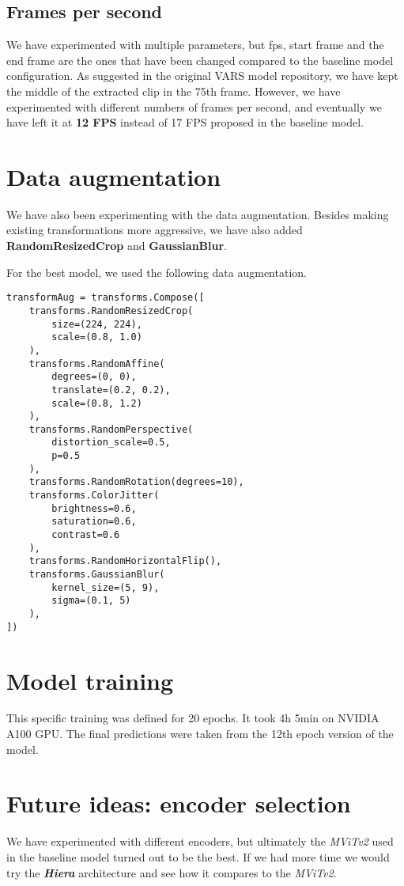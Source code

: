 \documentclass[conference]{IEEEtran}
\begin{document}
\subsection{Frames per second}
We have experimented with multiple parameters, but fps, start frame and the end frame are the ones that have been changed compared to the baseline model configuration. As suggested in the original VARS model repository, we have kept the middle of the extracted clip in the 75th frame. However, we have experimented with different numbers of frames per second, and eventually we have left it at \textbf{12 FPS} instead of 17 FPS proposed in the baseline model.

\section{Data augmentation}
We have also been experimenting with the data augmentation. Besides making existing transformations more aggressive, we have also added \textbf{RandomResizedCrop} and \textbf{GaussianBlur}.

For the best model, we used the following data augmentation.

\begin{verbatim}
transformAug = transforms.Compose([
    transforms.RandomResizedCrop(
        size=(224, 224),
        scale=(0.8, 1.0)
    ),
    transforms.RandomAffine(
        degrees=(0, 0),
        translate=(0.2, 0.2),
        scale=(0.8, 1.2)
    ),
    transforms.RandomPerspective(
        distortion_scale=0.5,
        p=0.5
    ),
    transforms.RandomRotation(degrees=10),
    transforms.ColorJitter(
        brightness=0.6,
        saturation=0.6,
        contrast=0.6
    ),
    transforms.RandomHorizontalFlip(),
    transforms.GaussianBlur(
        kernel_size=(5, 9),
        sigma=(0.1, 5)
    ),
])
\end{verbatim}

\section{Model training}
This specific training was defined for 20 epochs. It took 4h 5min on NVIDIA A100 GPU. The final predictions were taken from the 12th epoch version of the model.

\section{Future ideas: encoder selection}
We have experimented with different encoders, but ultimately the \textit{MViTv2} used in the baseline model turned out to be the best. If we had more time we would try the \textbf{\textit{Hiera}} architecture \cite{b1} and see how it compares to the \textit{MViTv2}.
\end{document}
